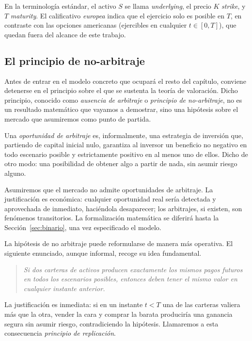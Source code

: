 \documentclass[11pt,a4paper,oneside]{report}
\theoremstyle{plain}
\theoremstyle{definition}
\theoremstyle{remark}
\newcommand{\1}{\mathbf{1}}
\begin{document}
En la terminología estándar, el activo
$S$ se llama \emph{underlying}, el precio $K$ \emph{strike}, y $T$
\emph{maturity}. El calificativo \emph{europea} indica que el
ejercicio solo es posible en $T$, en contraste con las opciones
americanas (ejercibles en cualquier $t \in [0, T]$), que quedan
fuera del alcance de este trabajo.

\subsection{El principio de no-arbitraje}
\label{subsec:noarbitraje}

Antes de entrar en el modelo concreto que ocupará el resto del
capítulo, conviene detenerse en el principio sobre el que se sustenta
la teoría de valoración. Dicho principio, conocido como \emph{ausencia
de arbitraje} o \emph{principio de no-arbitraje}, no es un resultado
matemático que vayamos a demostrar, sino una hipótesis sobre el mercado
que asumiremos como punto de partida.

Una \emph{oportunidad de arbitraje}
es, informalmente, una estrategia de inversión que, partiendo de
capital inicial nulo, garantiza al inversor un beneficio no negativo en
todo escenario posible y estrictamente positivo en al menos uno de
ellos. Dicho de otro modo: una posibilidad de obtener algo a partir de
nada, sin asumir riesgo alguno.

Asumiremos que el mercado no admite oportunidades de arbitraje. La
justificación es económica: cualquier oportunidad real sería
detectada y aprovechada de inmediato, haciéndola desaparecer; los
arbitrajes, si existen, son fenómenos transitorios. La formalización
matemática se diferirá hasta la Sección~\ref{sec:binario}, una vez
especificado el modelo.

La hipótesis de no
arbitraje puede reformularse de manera más operativa. El siguiente
enunciado, aunque informal, recoge su idea fundamental.

\begin{quote}
\emph{Si dos carteras de activos producen exactamente los mismos pagos
futuros en todos los escenarios posibles, entonces deben tener el mismo
valor en cualquier instante anterior.}
\end{quote}

La justificación es inmediata: si en un instante $t < T$ una de las
carteras valiera más que la otra, vender la cara y comprar la barata
produciría una ganancia segura sin asumir riesgo, contradiciendo la
hipótesis. Llamaremos a esta consecuencia \emph{principio de
replicación}.
\end{document}
